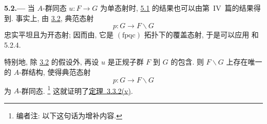 
\medskip
{}\label{par:sga3-VIA-5.2}%
\noindent\textbf{5.2.---}
当 \(A\)-群同态 \(u:F\to G\) 为单态射时,
\hyperref[par:sga3-VIA-5.1]{5.1} 的结果也可以由第~IV~篇的结果得到.
事实上, 由 \hyperref[thm:sga3-VIA-3.2]{3.2}, 典范态射
\[
  p:G\longrightarrow F\backslash G
\]
忠实平坦且为开态射; 因而由,
它是 \((\mathrm{fpqc})\) 拓扑下的覆盖态射,
于是可以应用 和 5.2.4.

特别地, 除 \hyperref[thm:sga3-VIA-3.2]{3.2} 的假设外,
再设 \(u\) 是正规子群 \(F\) 到 \(G\) 的包含.
则 \(F\backslash G\) 上存在唯一的 \(A\)-群结构, 使得典范态射
\[
  p:G\longrightarrow F\backslash G
\]
为 \(A\)-群同态.%
\footnote{\label{note:sga3-VIA-51}编者注: 以下这句话为增补内容.}
这就证明了\hyperref[concl:sga3-VIA-3.3.2-v]{定理~3.3.2(v)}.
